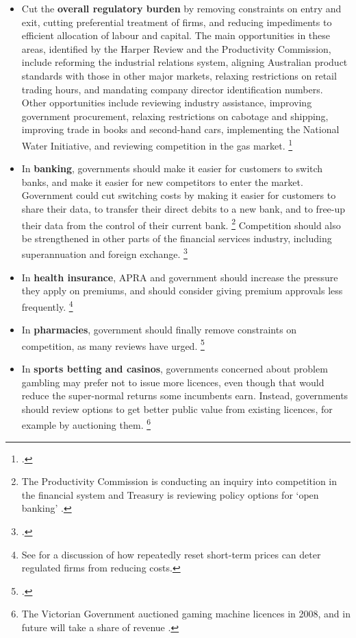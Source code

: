 \begin{itemize}
\item Cut the \textbf{overall regulatory burden} by removing constraints on entry and exit, cutting preferential treatment of firms, and reducing impediments to efficient allocation of labour and capital. The main opportunities in these areas, identified by the Harper Review and the Productivity Commission, include reforming the industrial relations system, aligning Australian product standards with those in other major markets, relaxing restrictions on retail trading hours, and mandating company director identification numbers. Other opportunities include reviewing industry assistance, improving government procurement, relaxing restrictions on cabotage and shipping, improving trade in books and second-hand cars, implementing the National Water Initiative, and reviewing competition in the gas market.%
\footnote{\textcites{Harper2015Competition}{PC-shiftthedial-2017}.}
\item In \textbf{banking}, governments should make it easier for customers to switch banks, and make it easier for new competitors to enter the market. Government could cut switching costs by making it easier for customers to share their data, to transfer their direct debits to a new bank, and to free-up their data from the control of their current bank.%
\footnote{The Productivity Commission is conducting an inquiry into competition in the financial system \parencite{PC-FScompetition-2017} and Treasury is reviewing policy options for `open banking' \parencite{Treasury-openbanking-2017}.}
Competition should also be strengthened in other parts of the financial services industry, including superannuation and foreign exchange.%
\footnote{\textcites{MinifieSavageCameron-2015-Super-savings}{Forexfees2017}.}
\item In \textbf{health insurance}, APRA and government should increase the pressure they apply on premiums, and should consider giving premium approvals less frequently.%
\footnote{See \textcite[][Chapter~9]{LaffontTiroleTheory1993} for a discussion of how repeatedly reset short-term prices can deter regulated firms from reducing costs.} 
\item In \textbf{pharmacies}, government should finally remove constraints on competition, as many reviews have urged.%
\footcite{PC-shiftthedial-2017}
\item In \textbf{sports betting and casinos}, governments concerned about problem gambling may prefer not to issue more licences, even though that would reduce the super-normal returns some incumbents earn. Instead, governments should review options to get better public value from existing licences, for example by auctioning them.%
\footnote{The Victorian Government auctioned gaming machine licences in 2008, and in future will take a share of revenue \parencite{Vic-gaming-machine-2017}.}

\end{itemize}

